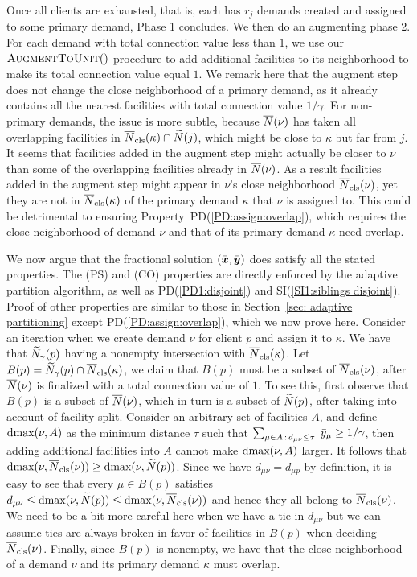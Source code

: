 \documentclass[11pt]{article}
\begin{document}
Once all clients are exhausted, that is, each has $r_j$
demands created and assigned to some primary demand, Phase 1
concludes. We then do an augmenting phase 2. For each demand
with total connection value less than $1$, we use our
${\textsc{AugmentToUnit}}()$ procedure to add additional facilities to
its neighborhood to make its total connection value equal
$1$. We remark here that the augment step does not change
the close neighborhood of a primary demand, as it already
contains all the nearest facilities with total connection
value $1/\gamma$.  For non-primary demands, the issue is
more subtle, because ${\overline{N}}(\nu)$ has taken all overlapping
facilities in ${\overline{N}}_{\text{cls}}(\kappa)\cap {\widetilde N}(j)$, which
might be close to $\kappa$ but far from $j$. It seems that
facilities added in the augment step might actually be
closer to $\nu$ than some of the overlapping facilities
already in ${\overline{N}}(\nu)$. As a result facilities added in
the augment step might appear in $\nu$'s close neighborhood
${\overline{N}}_{\text{cls}}(\nu)$, yet they are not in ${\overline{N}}_{\text{cls}}(\kappa)$
of the primary demand $\kappa$ that $\nu$ is assigned
to. This could be detrimental to ensuring
Property~PD(\ref{PD:assign:overlap}), which requires the
close neighborhood of demand $\nu$ and that of its primary
demand $\kappa$ need overlap.

We now argue that the fractional solution
$(\bar{\boldsymbol{x}},\bar{\boldsymbol{y}})$ does satisfy all the stated
properties. The (PS) and (CO) properties are directly
enforced by the adaptive partition algorithm, as well as
PD(\ref{PD1:disjoint}) and SI(\ref{SI1:siblings
  disjoint}). Proof of other properties are similar to those
in Section~\ref{sec: adaptive partitioning} except
PD(\ref{PD:assign:overlap}), which we now prove
here. Consider an iteration when we create demand $\nu$ for
client $p$ and assign it to $\kappa$. We have that
${\widetilde N}_{\gamma}(p)$ having a nonempty intersection with
${\overline{N}}_{\text{cls}}(\kappa)$. Let $B(p)={\widetilde N}_{\gamma}(p)\cap
{\overline{N}}_{\text{cls}}(\kappa)$, we claim that $B(p)$ must be a subset
of ${\overline{N}}_{\text{cls}}(\nu)$, after ${\overline{N}}(\nu)$ is finalized with
a total connection value of $1$. To see this, first observe
that $B(p)$ is a subset of ${\overline{N}}(\nu)$, which in turn is a
subset of ${\widetilde N}(p)$, after taking into account of
facility split. Consider an arbitrary set of facilities $A$,
and define $\text{dmax}(\nu, A)$ as the minimum distance $\tau$
such that $\sum_{\mu\in A {\,:\,} d_{\mu\nu} \leq
  \tau}\;{\bar y}_{\mu} \geq 1/\gamma$, then adding additional
facilities into $A$ cannot make $\text{dmax}(\nu, A)$ larger. It
follows that $\text{dmax}(\nu, {\overline{N}}_{\text{cls}}(\nu)) \geq \text{dmax}(\nu,
{\widetilde N}(p))$. Since we have $d_{\mu \nu} = d_{\mu p}$ by
definition, it is easy to see that every $\mu \in B(p)$
satisfies $d_{\mu \nu} \leq \text{dmax}(\nu, {\widetilde N}(p)) \leq
\text{dmax}(\nu, {\overline{N}}_{\text{cls}}(\nu))$ and hence they all belong to
${\overline{N}}_{\text{cls}}(\nu)$. We need to be a bit more careful here
when we have a tie in $d_{\mu\nu}$ but we can assume ties
are always broken in favor of facilities in $B(p)$ when
deciding ${\overline{N}}_{\text{cls}}(\nu)$. Finally, since $B(p)$ is
nonempty, we have that the close neighborhood of a demand
$\nu$ and its primary demand $\kappa$ must overlap.
\end{document}
